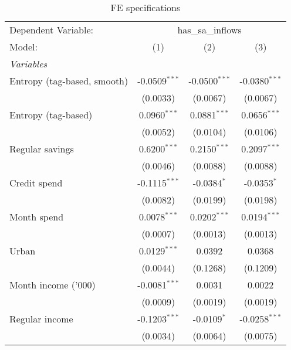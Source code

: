 
\begin{table}[htbp]
   \centering
   \caption{\label{tab:reg_entropy_savings_fe} FE specifications}
   \begin{footnotesize}
      \begin{tabular}{lccc}
         \tabularnewline\midrule\midrule
         Dependent Variable: & \multicolumn{3}{c}{has\_sa\_inflows}\\
         Model:                      & (1)             & (2)             & (3)\\
         \midrule \emph{Variables} &   &   &  \\
         Entropy (tag-based, smooth) & -0.0509$^{***}$ & -0.0500$^{***}$ & -0.0380$^{***}$\\
                                     & (0.0033)        & (0.0067)        & (0.0067)\\
         Entropy (tag-based)         & 0.0960$^{***}$  & 0.0881$^{***}$  & 0.0656$^{***}$\\
                                     & (0.0052)        & (0.0104)        & (0.0106)\\
         Regular savings             & 0.6200$^{***}$  & 0.2150$^{***}$  & 0.2097$^{***}$\\
                                     & (0.0046)        & (0.0088)        & (0.0088)\\
         Credit spend                & -0.1115$^{***}$ & -0.0384$^{*}$   & -0.0353$^{*}$\\
                                     & (0.0082)        & (0.0199)        & (0.0198)\\
         Month spend                 & 0.0078$^{***}$  & 0.0202$^{***}$  & 0.0194$^{***}$\\
                                     & (0.0007)        & (0.0013)        & (0.0013)\\
         Urban                       & 0.0129$^{***}$  & 0.0392          & 0.0368\\
                                     & (0.0044)        & (0.1268)        & (0.1209)\\
         Month income ('000)         & -0.0081$^{***}$ & 0.0031          & 0.0022\\
                                     & (0.0009)        & (0.0019)        & (0.0019)\\
         Regular income              & -0.1203$^{***}$ & -0.0109$^{*}$   & -0.0258$^{***}$\\
                                     & (0.0034)        & (0.0064)        & (0.0075)\\

\end{tabular}
\end{footnotesize}
\end{table}
